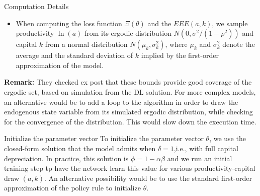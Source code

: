 \documentclass[aspectratio=169]{beamer} %
\begin{document}
\begin{frame}{Computation Details}
\begin{itemize}
    \item When computing the loss function $\Xi(\theta)$ and the $EEE(a,k)$, we sample productivity $\ln (a)$ from its ergodic distribution $N(0,\sigma^2/(1-\rho^2))$ and capital $k$ from a normal distribution $N(\mu_k, \sigma_k^2)$, where $\mu_k$ and $\sigma_k^2$ denote the average and the standard deviation of $k$ implied by the first-order approximation of the model. 
\end{itemize}
    \textbf{Remark:} They checked ex post that these bounds provide good coverage of the ergodic set, based on simulation from the DL solution. For more complex models, an alternative would be to add a loop to the algorithm in order to draw the endogenous state variable from its simulated ergodic distribution, while checking for the convergence of the distribution. This would slow down the execution time. 
\end{frame}

\begin{frame}{Initialize the parameter vector}
To initialize the parameter vector $\theta$, we use the closed-form solution that the model admits when $\delta=1$,i.e., with full capital depreciation. In practice, this solution is $\phi=1-\alpha\beta$ and we run an initial training step tp have the network learn this value for various productivity-capital draw $(a,k)$. An alternative possibility would be to use the standard first-order approximation of the policy rule to initialize $\theta$.
    
\end{frame}
\end{document}

